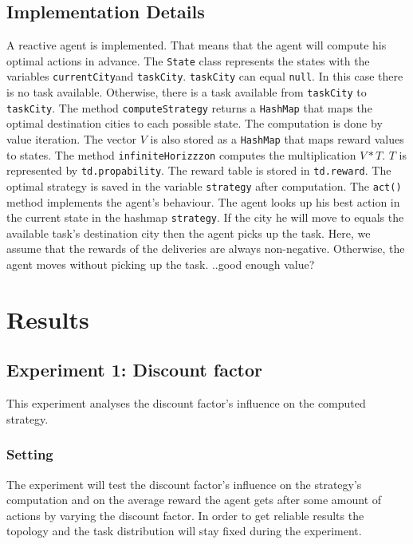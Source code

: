 \documentclass[11pt]{article}
\begin{document}
\subsection{Implementation Details}
A reactive agent is implemented. That means that the agent will compute his optimal actions in advance. 
The {\tt State} class represents the states with the variables {\tt currentCity}and {\tt taskCity}. {\tt taskCity} can equal {\tt null}. In this case there is no task available. Otherwise, there is a task available from {\tt taskCity} to {\tt taskCity}. 
The method {\tt computeStrategy} returns a {\tt HashMap} that maps the optimal destination cities to each possible state. The computation is done by value iteration. The vector \(V\) is also stored as a {\tt HashMap} that maps reward values to states. 
The method {\tt infiniteHorizzzon} computes the multiplication \(V*T\). \(T\) is represented by {\tt td.propability}. 
The reward table is stored in {\tt td.reward}. The optimal strategy is saved in the variable {\tt strategy} after computation.
The {\tt act()} method implements the agent's behaviour. The agent looks up his best action in the current state in the hashmap {\tt strategy}. If the city he will move to equals the available task's destination city then the agent picks up the task. Here, we assume that the rewards of the deliveries are always non-negative. Otherwise, the agent moves without picking up the task. ..good enough value?


\section{Results}

\subsection{Experiment 1: Discount factor}
This experiment analyses the discount factor's influence on the computed strategy.  

\subsubsection{Setting}
The experiment will test the discount factor's influence on the strategy's computation and on the average reward the agent gets after some amount of actions by varying the discount factor. In order to get reliable results the topology and the task distribution will stay fixed during the experiment. 
\end{document}
